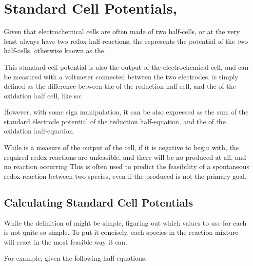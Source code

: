 


	\section{Standard Cell Potentials, \texorpdfstring{\Ecell{}}{Ecell}}

		Given that electrochemical cells are often made of two half-cells, or at the very least always have two redox half-reactions,
		the \Ecell{} represents the  potential of the two half-cells, otherwise known as the .

		This standard cell potential is also the output \emf{} of the electrochemical cell, and can be measured with a voltmeter
		connected between the two electrodes. \Ecell{} is simply defined as the difference between the \Eo{} of the reduction half cell, and
		the \Eo{} of the oxidation half cell, like so:

		\mathdiagram{
			\[ \MEcell = E^{\stdst}_{cathode} - E^{\stdst}_{anode} \]
		}

		However, with some sign manipulation, it can be also expressed as the sum of the standard electrode potential of the reduction
		half-equation, and the  of the oxidation half-equation.

		While \Ecell{} is a measure of the output \emf{} of the cell, if it is negative to begin with, the required redox
		reactions are unfeasible, and there will be no \emf{} produced at all, and no reaction occurring This is often used to predict
		the feasibility of a spontaneous redox reaction between two species, even if the produced \emf{} is not the primary goal.


		\subsection{Calculating Standard Cell Potentials}

			While the definition of \Ecell{} might be simple, figuring out which values to use for each \Eo{} is not quite so simple. To put it
			concisely, each species in the reaction mixture will react in the most feasible way it can.

			For example, given the following half-equations:



